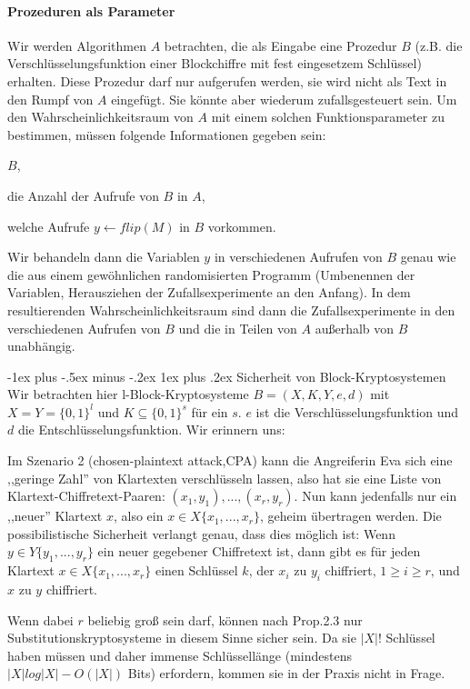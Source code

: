 \documentclass[a4paper]{article}
\makeatletter
\renewcommand{\subsubsection}{\@startsection{subsubsection}{3}{0mm}%
 {-1ex plus -.5ex minus -.2ex}%
 {1ex plus .2ex}%
 {\normalfont\small\bfseries}}
\makeatother
\begin{document}
\begin{multicols}{3}
    \paragraph{Prozeduren als Parameter}
    Wir werden Algorithmen $A$ betrachten, die als Eingabe eine Prozedur $B$ (z.B. die Verschlüsselungsfunktion einer Blockchiffre mit fest eingesetzem Schlüssel) erhalten. Diese Prozedur darf nur aufgerufen werden, sie wird nicht als Text in den Rumpf von $A$ eingefügt. Sie könnte aber wiederum zufallsgesteuert sein. Um den Wahrscheinlichkeitsraum von $A$ mit einem solchen Funktionsparameter zu bestimmen, müssen folgende Informationen gegeben sein:
    \begin{itemize*}
        \item $B$,
        \item die Anzahl der Aufrufe von $B$ in $A$,
        \item welche Aufrufe $y\leftarrow flip(M)$ in $B$ vorkommen.
    \end{itemize*}

    Wir behandeln dann die Variablen $y$ in verschiedenen Aufrufen von $B$ genau wie die aus einem gewöhnlichen randomisierten Programm (Umbenennen der Variablen, Herausziehen der Zufallsexperimente an den Anfang). In dem resultierenden Wahrscheinlichkeitsraum sind dann die Zufallsexperimente in den verschiedenen Aufrufen von $B$ und die in Teilen von $A$ außerhalb von $B$ unabhängig.

    \subsubsection{Sicherheit von Block-Kryptosystemen}
    Wir betrachten hier l-Block-Kryptosysteme $B=(X,K,Y,e,d)$ mit $X=Y=\{0,1\}^l$ und $K\subseteq\{0,1\}^s$ für ein $s$. $e$ ist die Verschlüsselungsfunktion und $d$ die Entschlüsselungsfunktion. Wir erinnern uns:
    \begin{enumerate*}
        \item Im Szenario 2 (chosen-plaintext attack,CPA) kann die Angreiferin Eva sich eine ,,geringe Zahl'' von Klartexten verschlüsseln lassen, also hat sie eine Liste von Klartext-Chiffretext-Paaren: $(x_1,y_1),...,(x_r,y_r)$. Nun kann jedenfalls nur ein ,,neuer'' Klartext $x$, also ein $x\in X\{x_1,...,x_r\}$, geheim übertragen werden. Die possibilistische Sicherheit verlangt genau, dass dies möglich ist: Wenn $y\in Y\{y_1,...,y_r\}$ ein neuer gegebener Chiffretext ist, dann gibt es für jeden Klartext $x\in X\{x_1,...,x_r\}$ einen Schlüssel $k$, der $x_i$ zu $y_i$ chiffriert, $1 \geq i\geq r$, und $x$ zu $y$ chiffriert.
        \item Wenn dabei $r$ beliebig groß sein darf, können nach Prop.2.3 nur Substitutionskryptosysteme in diesem Sinne sicher sein. Da sie $|X|!$ Schlüssel haben müssen und daher immense Schlüssellänge (mindestens $|X|log|X|-O(|X|)$ Bits) erfordern, kommen sie in der Praxis nicht in Frage.
    \end{enumerate*}


\end{multicols}
\end{document}
